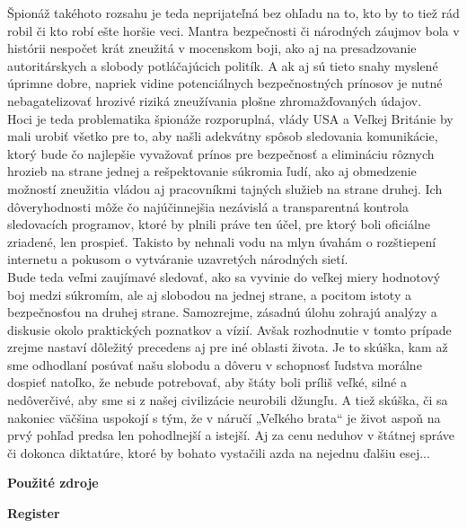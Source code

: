 \documentclass{article}
\begin{document}
\begin{flushleft}
Špionáž takéhoto rozsahu je teda neprijateľná bez ohľadu na to, kto by to tiež rád robil či kto robí ešte horšie veci. Mantra bezpečnosti či národných záujmov bola v histórii nespočet krát zneužitá v mocenskom boji, ako aj na presadzovanie autoritárskych a slobody potláčajúcich politík. A ak aj sú tieto snahy myslené úprimne dobre, napriek vidine potenciálnych bezpečnostných prínosov je nutné nebagatelizovať hrozivé riziká zneužívania plošne zhromažďovaných údajov.\\
Hoci je teda problematika špionáže rozporuplná, vlády USA a Veľkej Británie by mali urobiť všetko pre to, aby našli adekvátny spôsob sledovania komunikácie, ktorý bude čo najlepšie vyvažovať prínos pre bezpečnosť a elimináciu rôznych hrozieb na strane jednej a rešpektovanie súkromia ľudí, ako aj obmedzenie možností zneužitia vládou aj pracovníkmi tajných služieb na strane druhej. Ich dôveryhodnosti môže čo najúčinnejšia nezávislá a transparentná kontrola sledovacích programov, ktoré by plnili práve ten účel, pre ktorý boli oficiálne zriadené, len prospieť. Takisto by nehnali vodu na mlyn úvahám o rozštiepení internetu a pokusom o vytváranie uzavretých národných sietí.\\
Bude teda veľmi zaujímavé sledovať, ako sa vyvinie do veľkej miery hodnotový boj medzi súkromím, ale aj slobodou na jednej strane, a pocitom istoty a bezpečnosťou na druhej strane. Samozrejme, zásadnú úlohu zohrajú analýzy a diskusie okolo praktických poznatkov a vízií. Avšak rozhodnutie v tomto prípade zrejme nastaví dôležitý precedens aj pre iné oblasti života. Je to skúška, kam až sme odhodlaní posúvať našu slobodu a dôveru v schopnosť ľudstva morálne dospieť natoľko, že nebude potrebovať, aby štáty boli príliš veľké, silné a nedôverčivé, aby sme si z našej civilizácie neurobili džungľu. A tiež skúška, či sa nakoniec väčšina uspokojí s tým, že v náručí „Veľkého brata“ je život aspoň na prvý pohľad predsa len pohodlnejší a istejší. Aj za cenu neduhov v štátnej správe či dokonca diktatúre, ktoré by bohato vystačili azda na nejednu ďalšiu esej...\\

\pagebreak

\Large
\textbf{Použité zdroje}\\
\normalsize

\bigskip

\Large
\textbf{Register}\\
\normalsize

\end{flushleft}
\end{document}
